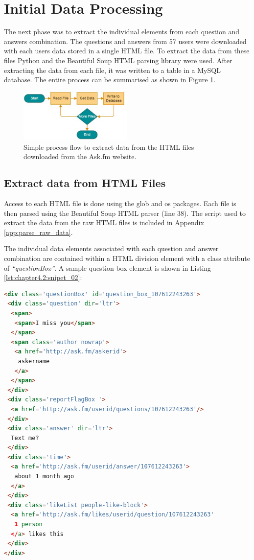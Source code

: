 \section{Initial Data Processing}
\label{section:initial_processing}

The next phase was to extract the individual elements from each question and answers combination. The questions and answers from 57 users were downloaded with each users data stored in a single HTML file. To extract the data from these files Python and the Beautiful Soup HTML parsing library were used. After extracting the data from each file, it was written to a table in a MySQL database. The entire process can be summarised as shown in Figure \ref{fig:chapter4:extract_data_from_html}.

\begin{figure}[htbp]
	\centering
	\includegraphics[width=0.5\textwidth]{Figures/Chapter4/extract_data_from_html.jpg}
	\caption[Simple process flow to extract data from HTML files]{Simple process flow to extract data from the HTML files downloaded from the Ask.fm website.}
	\label{fig:chapter4:extract_data_from_html}
\end{figure}

\subsection{Extract data from HTML Files}

Access to each HTML file is done using the glob and os packages. Each file is then parsed using the Beautiful Soup HTML parser (line 38). The script used to extract the data from the raw HTML files is included in Appendix \ref{app:parse_raw_data}. 

The individual data elements associated with each question and answer combination are contained within a HTML division element with a class attribute of \textit{``questionBox''}. A sample question box element is shown in Listing \ref{lst:chapter4.2:snipet_02}:

\begin{lstlisting}[language=html,caption={Sample question and answer HTML},label=lst:chapter4.2:snipet_02]
<div class='questionBox' id='question_box_107612243263'>
 <div class='question' dir='ltr'>
  <span>
   <span>I miss you</span>
  </span>
  <span class='author nowrap'>
   <a href='http://ask.fm/askerid'>
    askername
   </a>
  </span>
 </div>
 <div class='reportFlagBox '>
  <a href='http://ask.fm/userid/questions/107612243263'/>
 </div>
 <div class='answer' dir='ltr'>
  Text me?
 </div>
 <div class='time'>
  <a href='http://ask.fm/userid/answer/107612243263'>
   about 1 month ago
  </a>
 </div>
 <div class='likeList people-like-block'>
  <a href='http://ask.fm/likes/userid/question/107612243263' 
   1 person
  </a> likes this
 </div>
</div>
\end{lstlisting}

